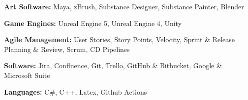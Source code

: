 


\begin{cvparagraph}
    \begin{cvitems}
        \text{}
        \item
        \item \textbf{Art Software:} Maya, zBrush, Substance Designer, Substance Painter, Blender
        \item \textbf{Game Engines:} Unreal Engine 5, Unreal Engine 4, Unity
        \item \textbf{Agile Management:} User Stories, Story Points, Velocity, Sprint \& Release Planning \& Review, Scrum, CD Pipelines
        \item \textbf{Software:} Jira, Confluence, Git, Trello, GitHub \& Bitbucket, Google \& Microsoft Suite
        \item \textbf{Languages:} C\#, C++, Latex, Github Actions
    \end{cvitems}

\end{cvparagraph}